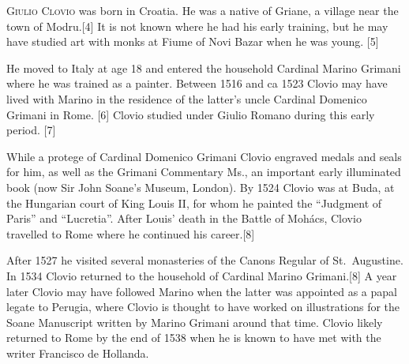 
\begin{greco}

\noindent \lettrine{G}{iulio Clovio} was born in Croatia. He was a native of Griane, a village near the town of Modru.[4] It is not known where he had his early training, but he may have studied art with monks at Fiume of Novi Bazar when he was young. [5] 

He moved to Italy at age 18 and entered the household Cardinal Marino Grimani where he was trained as a painter. Between 1516 and ca 1523 Clovio may have lived with Marino in the residence of the latter’s uncle Cardinal Domenico Grimani in Rome. [6] Clovio studied under Giulio Romano during this early period. [7]

While a protege of Cardinal Domenico Grimani Clovio engraved medals and seals for him, as well as the Grimani Commentary Ms., an important early illuminated book (now Sir John Soane's Museum, London).
By 1524 Clovio was at Buda, at the Hungarian court of King Louis II, for whom he painted the ``Judgment of Paris'' and ``Lucretia''. After Louis' death in the Battle of Mohács, Clovio travelled to Rome where he continued his career.[8]

After 1527 he visited several monasteries of the Canons Regular of St.~Augustine. In 1534 Clovio returned to the household of Cardinal Marino Grimani.[8] A year later Clovio may have followed Marino when the latter was appointed as a papal legate to Perugia, where Clovio is thought to have worked on illustrations for the Soane Manuscript written by Marino Grimani around that time. Clovio likely returned to Rome by the end of 1538 when he is known to have met with the writer Francisco de Hollanda.

\end{greco}






